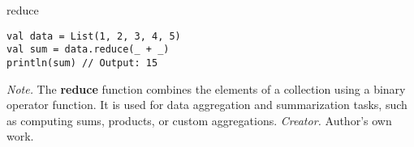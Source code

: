 \begin{table}[h!]
\caption{reduce}
\begin{lstlisting}
val data = List(1, 2, 3, 4, 5)
val sum = data.reduce(_ + _)
println(sum) // Output: 15
\end{lstlisting}
\small
\textit{Note.} The \textbf{reduce} function combines the elements of a collection using a binary operator function. It is used for data aggregation and summarization tasks, such as computing sums, products, or custom aggregations.
\textit{Creator.} Author's own work.
\end{table}